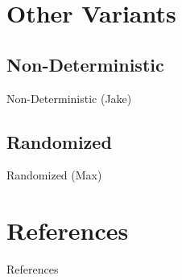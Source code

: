 \documentclass{beamer}
\begin{document}
\section{Other Variants}

\subsection{Non-Deterministic}

\begin{frame}{Non-Deterministic (Jake)}
\TODO
\end{frame}

\subsection{Randomized}

\begin{frame}{Randomized (Max)}
\TODO
\end{frame}

\section{References}

\begin{frame}[t, allowframebreaks]{References}


\end{frame}
\end{document}
